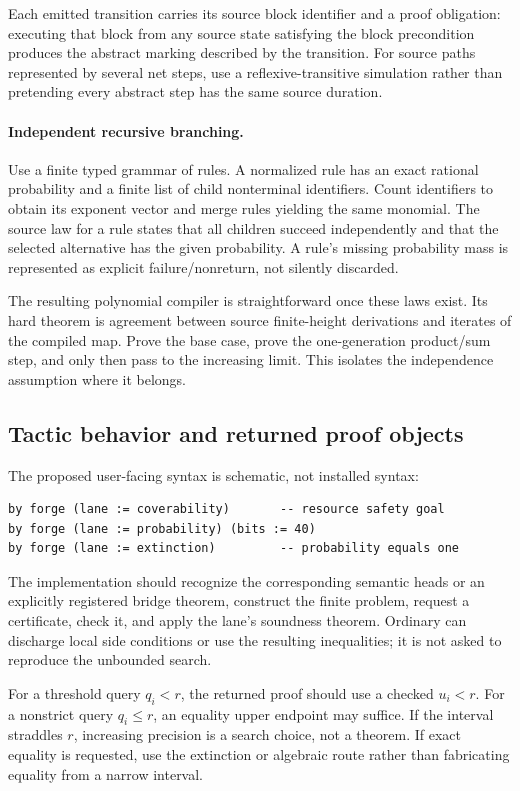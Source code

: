Each emitted transition carries its source block identifier and a proof obligation: executing that block from any source state satisfying the block precondition produces the abstract marking described by the transition. For source paths represented by several net steps, use a reflexive-transitive simulation rather than pretending every abstract step has the same source duration.

\paragraph{Independent recursive branching.}
Use a finite typed grammar of rules. A normalized rule has an exact rational probability and a finite list of child nonterminal identifiers. Count identifiers to obtain its exponent vector and merge rules yielding the same monomial. The source law for a rule states that all children succeed independently and that the selected alternative has the given probability. A rule's missing probability mass is represented as explicit failure/nonreturn, not silently discarded.

The resulting polynomial compiler is straightforward once these laws exist. Its hard theorem is agreement between source finite-height derivations and iterates of the compiled map. Prove the base case, prove the one-generation product/sum step, and only then pass to the increasing limit. This isolates the independence assumption where it belongs.

\subsection{Tactic behavior and returned proof objects}
The proposed user-facing syntax is schematic, not installed syntax:
\begin{lstlisting}
by forge (lane := coverability)       -- resource safety goal
by forge (lane := probability) (bits := 40)
by forge (lane := extinction)         -- probability equals one
\end{lstlisting}
The implementation should recognize the corresponding semantic heads or an explicitly registered bridge theorem, construct the finite problem, request a certificate, check it, and apply the lane's soundness theorem. Ordinary  can discharge local side conditions or use the resulting inequalities; it is not asked to reproduce the unbounded search.

For a threshold query $q_i<r$, the returned proof should use a checked $u_i<r$. For a nonstrict query $q_i\le r$, an equality upper endpoint may suffice. If the interval straddles $r$, increasing precision is a search choice, not a theorem. If exact equality is requested, use the extinction or algebraic route rather than fabricating equality from a narrow interval.

